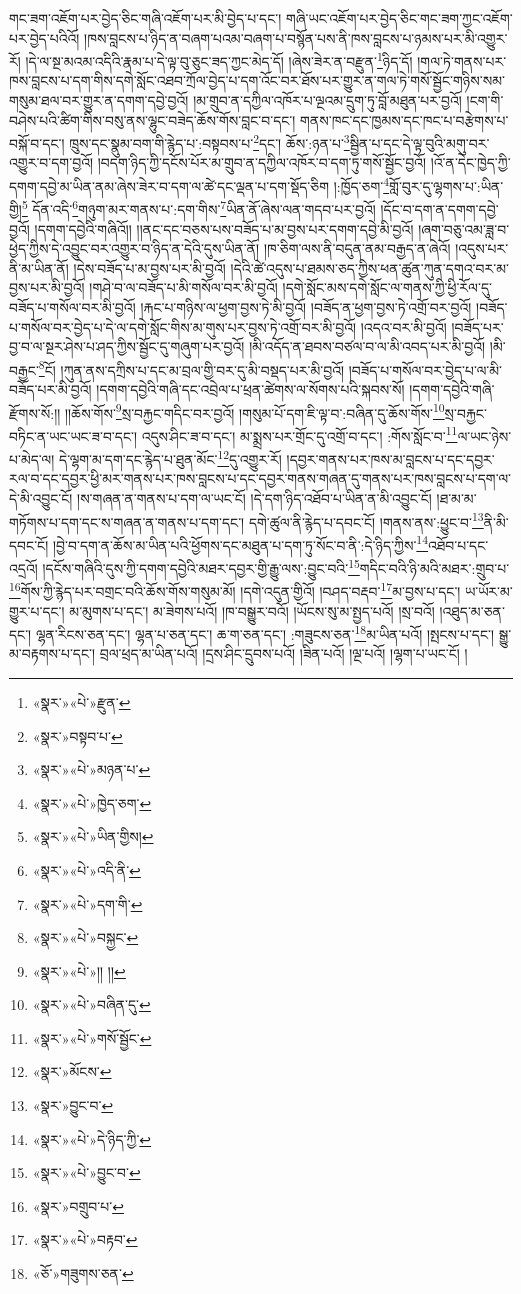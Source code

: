 གང་ཟག་འཇོག་པར་བྱེད་ཅིང་གཞི་འཇོག་པར་མི་བྱེད་པ་དང་། གཞི་ཡང་འཇོག་པར་བྱེད་ཅིང་གང་ཟག་ཀྱང་འཇོག་པར་བྱེད་པའིའོ། །ཁས་བླངས་པ་ཉིད་ན་བཞག་པའམ་བཞག་པ་བསྙོན་པས་ནི་ཁས་བླངས་པ་ཉམས་པར་མི་འགྱུར་རོ། །དེ་ལ་སྔ་མའམ་འདིའི་རྣམ་པ་དེ་ལྟ་བུ་ཅུང་ཟད་ཀྱང་མེད་དོ། །ཞེས་ཟེར་ན་བརྫུན་\footnote{«སྣར་»«པེ་»རྫུན་}ཉིད་དོ། །གལ་ཏེ་གནས་པར་ཁས་བླངས་པ་དག་གིས་དགེ་སློང་འཐབ་ཀྲོལ་བྱེད་པ་དག་འོང་བར་ཐོས་པར་གྱུར་ན་གལ་ཏེ་གསོ་སྦྱོང་གཉིས་སམ་གསུམ་ཐལ་བར་གྱུར་ན་དགག་དབྱེ་བྱའོ། །མ་གྲུབ་ན་དཀྱིལ་འཁོར་པ་ལྔའམ་དྲུག་ཏུ་བློ་མཐུན་པར་བྱའོ། །ངག་གི་བཤེས་པའི་ཚིག་གིས་བསུ་ནས་ལྷུང་བཟེད་ཆོས་གོས་བླང་བ་དང་། གནས་ཁང་དང་ཁྱམས་དང་ཁང་པ་བརྩེགས་པ་བསྐོ་བ་དང་། ཁྲུས་དང་སྣུམ་བག་གི་རྙེད་པ་:བསྟབས་པ་\footnote{«སྣར་»བསྟབ་པ་}དང་། ཆོས་:ཉན་པ་\footnote{«སྣར་»«པེ་»མཉན་པ་}སྦྱིན་པ་དང་དེ་ལྟ་བུའི་མགུ་བར་འགྱུར་བ་དག་བྱའོ། །བདག་ཉིད་ཀྱི་དངོས་པོར་མ་གྲུབ་ན་དཀྱིལ་འཁོར་བ་དག་ཏུ་གསོ་སྦྱོང་བྱའོ། །འོ་ན་དེང་ཁྱེད་ཀྱི་དགག་དབྱེ་མ་ཡིན་ནམ་ཞེས་ཟེར་བ་དག་ལ་ཚེ་དང་ལྡན་པ་དག་སྡོད་ཅིག །:ཁྱོད་ཅག་\footnote{«སྣར་»«པེ་»ཁྱེད་ཅག་}གློ་བུར་དུ་ལྷགས་པ་:ཡིན་གྱི།\footnote{«སྣར་»«པེ་»ཡིན་གྱིས།} དོན་འདི་\footnote{«སྣར་»«པེ་»འདི་ནི་}གཉུག་མར་གནས་པ་:དག་གིས་\footnote{«སྣར་»«པེ་»དག་གི་}ཡིན་ནོ་ཞེས་ལན་གདབ་པར་བྱའོ། །དོང་བ་དག་ན་དགག་དབྱེ་བྱའོ། །དགག་དབྱེའི་གཞིའོ།། །།ནང་དང་བཅས་པས་བཟོད་པ་མ་བྱས་པར་དགག་དབྱེ་མི་བྱའོ། །ཞག་བཅུ་འམ་ཟླ་བ་ཕྱེད་ཀྱིས་དེ་འབྱུང་བར་འགྱུར་བ་ཉིད་ན་དེའི་དུས་ཡིན་ནོ། །ཁ་ཅིག་ལས་ནི་བདུན་ནམ་བརྒྱད་ན་ཞེའོ། །འདུས་པར་ནི་མ་ཡིན་ནོ། །དེས་བཟོད་པ་མ་བྱས་པར་མི་བྱའོ། །དེའི་ཚེ་འདུས་པ་ཐམས་ཅད་ཀྱིས་ཕན་ཚུན་ཀུན་དགའ་བར་མ་བྱས་པར་མི་བྱའོ། །གཤེ་བ་ལ་བཟོད་པ་མི་གསོལ་བར་མི་བྱའོ། །དགེ་སློང་མས་དགེ་སློང་ལ་གནས་ཀྱི་ཕྱི་རོལ་དུ་བཟོད་པ་གསོལ་བར་མི་བྱའོ། །རྐང་པ་གཉིས་ལ་ཕྱག་བྱས་ཏེ་མི་བྱའོ། །བཟོད་ན་ཕྱག་བྱས་ཏེ་འགྲོ་བར་བྱའོ། །བཟོད་པ་གསོལ་བར་བྱེད་པ་དེ་ལ་དགེ་སློང་གིས་མ་གུས་པར་བྱས་ཏེ་འགྲོ་བར་མི་བྱའོ། །འདའ་བར་མི་བྱའོ། །བཟོད་པར་བྱ་བ་ལ་སྔར་ཤེས་པ་ཤད་ཀྱིས་སྦྱོང་དུ་གཞུག་པར་བྱའོ། །མི་འདོད་ན་ཐབས་བཙལ་བ་ལ་མི་འབད་པར་མི་བྱའོ། །མི་བརྒྱང་\footnote{«སྣར་»«པེ་»བསྐྱང་}ངོ། །ཀུན་ནས་དཀྲིས་པ་དང་མ་བྲལ་གྱི་བར་དུ་མི་བསྡད་པར་མི་བྱའོ། །བཟོད་པ་གསོལ་བར་བྱེད་པ་ལ་མི་བཟོད་པར་མི་བྱའོ། །དགག་དབྱེའི་གཞི་དང་འབྲེལ་པ་ཕྲན་ཚེགས་ལ་སོགས་པའི་སྐབས་སོ། །དགག་དབྱེའི་གཞི་རྫོགས་སོ:།། །།ཆོས་གོས་\footnote{«སྣར་»«པེ་»།། །།}སྲ་བརྐྱང་གདིང་བར་བྱའོ། །གསུམ་པོ་དག་ཇི་ལྟ་བ་:བཞིན་དུ་ཆོས་གོས་\footnote{«སྣར་»«པེ་»བཞིན་དུ་}སྲ་བརྐྱང་བཏིང་ན་ཡང་ཡང་ཟ་བ་དང་། འདུས་ཤིང་ཟ་བ་དང་། མ་སྨྲས་པར་གྲོང་དུ་འགྲོ་བ་དང་། :གོས་སློང་བ་\footnote{«སྣར་»«པེ་»གསོ་སྦྱོང་}ལ་ཡང་ཉེས་པ་མེད་ལ། དེ་ལྷག་མ་དག་དང་རྙེད་པ་ཐུན་མོང་\footnote{«སྣར་»མོངས་}དུ་འགྱུར་རོ། །དབྱར་གནས་པར་ཁས་མ་བླངས་པ་དང་དབྱར་རལ་བ་དང་དབྱར་ཕྱི་མར་གནས་པར་ཁས་བླངས་པ་དང་དབྱར་གནས་གཞན་དུ་གནས་པར་ཁས་བླངས་པ་དག་ལ་དེ་མི་འབྱུང་ངོ། །ས་གཞན་ན་གནས་པ་དག་ལ་ཡང་ངོ། །དེ་དག་ཉིད་འཐོབ་པ་ཡིན་ན་མི་འབྱུང་ངོ། །ཐ་མ་མ་གཏོགས་པ་དག་དང་ས་གཞན་ན་གནས་པ་དག་དང་། དགེ་ཚུལ་ནི་རྙེད་པ་དབང་ངོ། །གནས་ནས་:ཕྱུང་བ་\footnote{«སྣར་»བྱུང་བ་}ནི་མི་དབང་ངོ། །བྱེ་བ་དག་ན་ཆོས་མ་ཡིན་པའི་ཕྱོགས་དང་མཐུན་པ་དག་ཏུ་སོང་བ་ནི་:དེ་ཉིད་ཀྱིས་\footnote{«སྣར་»«པེ་»དེ་ཉིད་ཀྱི་}འཐོབ་པ་དང་འདྲའོ། །དངོས་གཞིའི་དུས་ཀྱི་དགག་དབྱེའི་མཐར་དབྱར་གྱི་རྒྱུ་ལས་:བྱུང་བའི་\footnote{«སྣར་»«པེ་»བྱུང་བ་}གདིང་བའི་ཉི་མའི་མཐར་:གྲུབ་པ་\footnote{«སྣར་»བགྲུབ་པ་}གོས་ཀྱི་རྙེད་པར་བགྲང་བའི་ཆོས་གོས་གསུམ་མོ། །དགེ་འདུན་གྱིའོ། །བཤད་བརྡབ་\footnote{«སྣར་»«པེ་»བརྟབ་}མ་བྱས་པ་དང་། ཡ་ཡོར་མ་གྱུར་པ་དང་། མ་མུགས་པ་དང་། མ་ཟེགས་པའོ། །ཁ་བསྒྱུར་བའོ། །ཡོངས་སུ་མ་སྤྱད་པའོ། །སྲ་བའོ། །འཐུད་མ་ཅན་དང་། ལྷན་རིངས་ཅན་དང་། ལྷན་པ་ཅན་དང་། ཆ་ག་ཅན་དང་། :གཟུངས་ཅན་\footnote{«ཅོ་»གཟུགས་ཅན་}མ་ཡིན་པའོ། །སྤངས་པ་དང་། སྒྱུ་མ་བརྟགས་པ་དང་། བྲལ་ཕྲད་མ་ཡིན་པའོ། །དྲས་ཤིང་དྲུབས་པའོ། །ཟིན་པའོ། །ལྔ་པའོ། །ལྷག་པ་ཡང་ངོ། །
